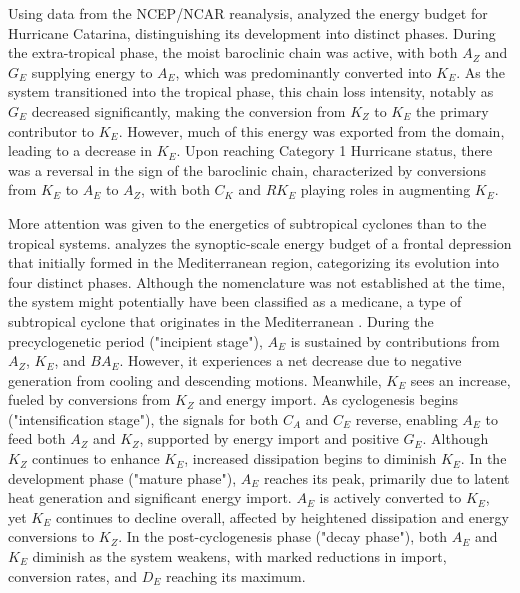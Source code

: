 Using data from the NCEP/NCAR reanalysis, \citet{veiga2008analysis} analyzed the energy budget for Hurricane Catarina, distinguishing its development into distinct phases. During the extra-tropical phase, the moist baroclinic chain was active, with both \(A_Z\) and \(G_E\) supplying energy to \(A_E\), which was predominantly converted into \(K_E\). As the system transitioned into the tropical phase, this chain loss intensity, notably as \(G_E\) decreased significantly, making the conversion from \(K_Z\) to \(K_E\) the primary contributor to \(K_E\). However, much of this energy was exported from the domain, leading to a decrease in \(K_E\). Upon reaching Category 1 Hurricane status, there was a reversal in the sign of the baroclinic chain, characterized by conversions from \(K_E\) to \(A_E\) to \(A_Z\), with both \(C_K\) and \(RK_E\) playing roles in augmenting \(K_E\). 

 
More attention was given to the energetics of subtropical cyclones than to the tropical systems. \citet{michaelides1987limited} analyzes the synoptic-scale energy budget of a frontal depression that initially formed in the Mediterranean region, categorizing its evolution into four distinct phases. Although the nomenclature was not established at the time, the system might potentially have been classified as a medicane, a type of subtropical cyclone that originates in the Mediterranean \citep{da2019subtropical}. During the precyclogenetic period ("incipient stage"), \(A_E\) is sustained by contributions from \(A_Z\), \(K_E\), and \(BA_E\). However, it experiences a net decrease due to negative generation from cooling and descending motions. Meanwhile, \(K_E\) sees an increase, fueled by conversions from \(K_Z\) and energy import. As cyclogenesis begins ("intensification stage"), the signals for both \(C_A\) and \(C_E\) reverse, enabling \(A_E\) to feed both \(A_Z\) and \(K_Z\), supported by energy import and positive \(G_E\). Although \(K_Z\) continues to enhance \(K_E\), increased dissipation begins to diminish \(K_E\). In the development phase ("mature phase"), \(A_E\) reaches its peak, primarily due to latent heat generation and significant energy import. \(A_E\) is actively converted to \(K_E\), yet \(K_E\) continues to decline overall, affected by heightened dissipation and energy conversions to \(K_Z\). In the post-cyclogenesis phase ("decay phase"), both \(A_E\) and \(K_E\) diminish as the system weakens, with marked reductions in import, conversion rates, and \(D_E\) reaching its maximum.

